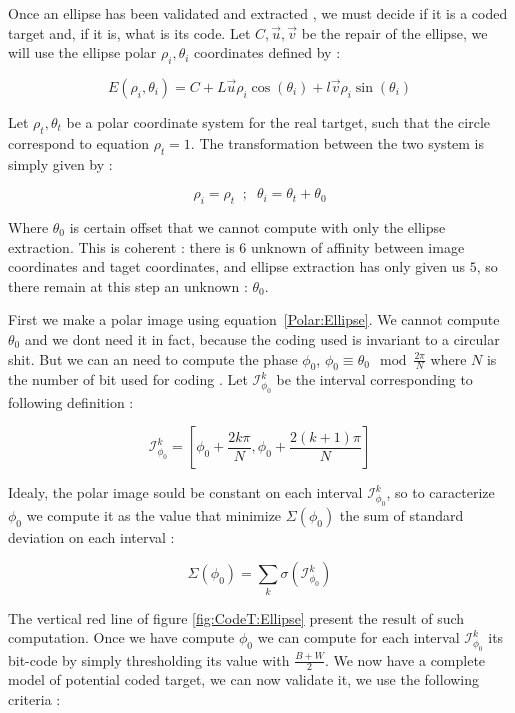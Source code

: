 Once an ellipse has been validated and extracted , we must decide
if it is a coded target and, if it is, what is its code.  Let $C,\vec{u},\vec{v}$
be the repair of the ellipse, we will use the ellipse polar $\rho_i,\theta_i$
coordinates defined by :

\begin{equation}
	E(\rho_i,\theta_i) = C+L\vec{u}\rho_i \cos(\theta_i) +l\vec{v}\rho_i \sin(\theta_i) \label{Polar:Ellipse}
\end{equation}

Let $\rho_t,\theta_t$ be a polar coordinate system for the real tartget, such that  
the circle correspond to equation $\rho_t=1$. The transformation between the two system
is simply given by :

\begin{equation}
	\rho_i = \rho_t  \;\; ; \; \; \theta_i   =  \theta_t + \theta_0 \label{ElTargToIm}
\end{equation}

Where $\theta_0$ is certain offset that we cannot compute with only the ellipse extraction.
This is coherent : there is  $6$ unknown of affinity between image coordinates and taget coordinates,
and ellipse extraction has only given us $5$, so there remain at this step an unknown : $\theta_0$.

First we make a polar image using equation~\ref{Polar:Ellipse}.  
We cannot compute $\theta_0$ and we dont need it in fact, because the coding 
used is invariant to a circular shit. But we can an need to compute the phase $\phi_0$,
$\phi_0 \equiv \theta_0 \mod \frac{2 \pi}{N}$ where $N$ is the number of bit used for coding .
Let $\mathcal{I}^{k}_{\phi_0}$ be the interval corresponding to following definition :

\begin{equation}
	\mathcal{I}^{k}_{\phi_0} = [\phi_0 +\frac{2k \pi}{N},\phi_0 +\frac{2(k+1) \pi}{N}]
\end{equation}

Idealy, the polar image sould be constant on each interval $\mathcal{I}^{k}_{\phi_0}$, so 
to caracterize $\phi_0$ we compute it  as the value that minimize $\Sigma(\phi_0)$ 
the sum of standard deviation on each interval :

\begin{equation}
	\Sigma(\phi_0) =  \sum _k \sigma(\mathcal{I}^{k}_{\phi_0})
\end{equation}

The vertical red line of figure \ref{fig:CodeT:Ellipse} present the result of such computation.
Once we have compute $\phi_0$ we can compute for each interval $\mathcal{I}^{k}_{\phi_0}$ its 
bit-code by simply thresholding its value with $\frac{B+W}{2}$. We now have a complete model
of potential coded target, we can now validate it,  we use the following criteria :

